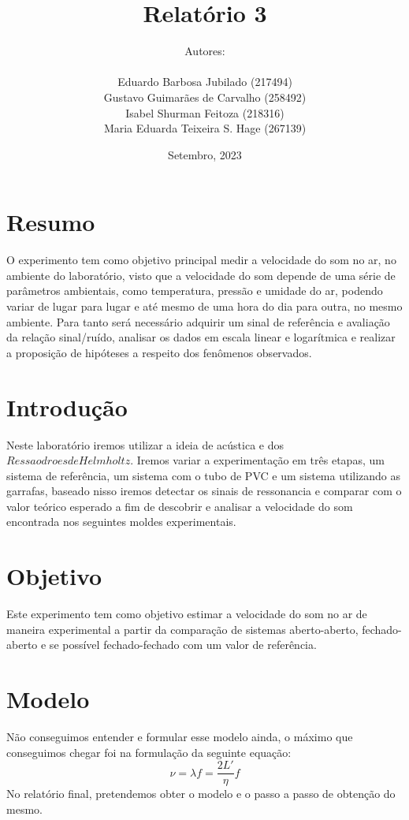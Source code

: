 \documentclass[a4paper]{report}
\title{\huge
{\textbf{Relatório 3}}
 \\
\fontsize{30pt}{36pt}\selectfont{\textbf{Planejamento Acústica}}
}
\author{
Autores:\\ \ \\
Eduardo Barbosa Jubilado (217494)\\
Gustavo Guimarães de Carvalho (258492)\\
Isabel Shurman Feitoza (218316)\\
Maria Eduarda Teixeira S. Hage (267139) 
}
\date{Setembro, 2023}
\begin{document}
\pagestyle{fancy}
\fancyfoot{}\fancyhead{}
\maketitle{}
\pagebreak
{}
\fancyfoot[R]{\thepage}

\section*{Resumo}
\qquad O experimento tem como objetivo principal medir a velocidade do som no ar, no ambiente do laboratório, visto que a velocidade do som depende de uma série de parâmetros ambientais, como temperatura, pressão e umidade do ar, podendo variar de lugar para lugar e até mesmo de uma hora do dia para outra, no mesmo ambiente. Para tanto será necessário adquirir um sinal de referência e avaliação da relação sinal/ruído, analisar os dados em escala linear e logarítmica e realizar a proposição de hipóteses a respeito dos fenômenos observados.
\section*{Introdução}
\qquad Neste laboratório iremos utilizar a ideia de acústica e dos $Ressaodroes de Helmholtz$. Iremos variar a experimentação em três etapas, um sistema de referência, um sistema com o tubo de PVC e um sistema utilizando as garrafas, baseado nisso iremos detectar os sinais de ressonancia e comparar com o valor teórico esperado a fim de descobrir e analisar a velocidade do som encontrada nos seguintes moldes experimentais. 

\section*{Objetivo}
\qquad Este experimento tem como objetivo estimar a velocidade do som no ar de maneira experimental a partir da comparação de sistemas aberto-aberto, fechado-aberto e se possível fechado-fechado com um valor de referência.
 
\section*{Modelo}
\qquad Não conseguimos entender e formular esse modelo ainda, o máximo que conseguimos chegar foi na formulação da seguinte equação:
\begin{equation}
    \nu = \lambda f = \frac{2 L'}{\eta} f 
\end{equation}
\qquad No relatório final, pretendemos obter o modelo e o passo a passo de obtenção do mesmo.
\end{document}
